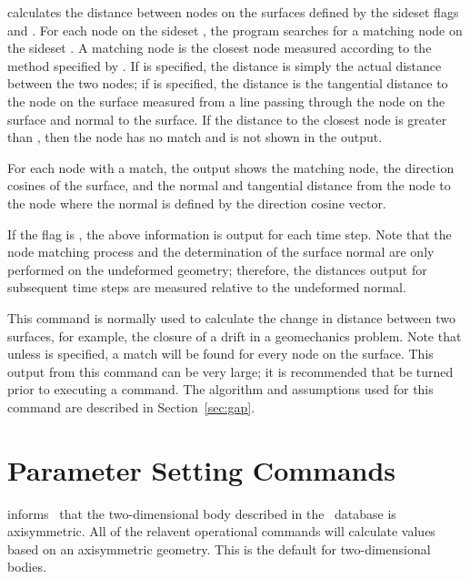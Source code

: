  {
 calculates the distance between nodes on the surfaces defined
by the sideset flags  and .  For each
node on the sideset , the program searches for a
matching node on the sideset .  A matching node is
the closest node measured according to the method specified by
.  If  is specified, the
distance is simply the actual distance between the two nodes; if
 is specified, the distance is the tangential distance to
the node on the  surface measured from a line passing
through the node on the  surface and normal to the
surface.  If the distance to the closest  node is
greater than , then the  node has no
match and is not shown in the output.  

For each   node with a match, the output shows the
matching   node, the direction cosines of the surface,
and the normal and tangential distance from the   node
to the   node where the normal is defined by the
direction cosine vector.

If the  flag is , the above information is output
for each time step.  Note that the node matching process and the
determination of the surface normal are only performed on the undeformed
geometry; therefore, the distances output for subsequent time steps are
measured relative to the undeformed normal.  

This command is normally used to calculate the change in distance
between two surfaces, for example, the closure of a drift in a
geomechanics problem.  Note that unless  is specified,
a match will be found for every node on the  surface.
This output from this command can be very large; it is recommended that
 be turned  prior to executing a  command.
The algorithm and assumptions used for this command are described in
Section~\ref{sec:gap}.
}

\section{Parameter Setting Commands}\label{sec:param}

 {
 informs \numbers\ that the two-dimensional body
described in the \EXO\ database is axisymmetric.  All of the relavent
operational commands will calculate values based on an axisymmetric
geometry.  This is the default for two-dimensional bodies.
}

